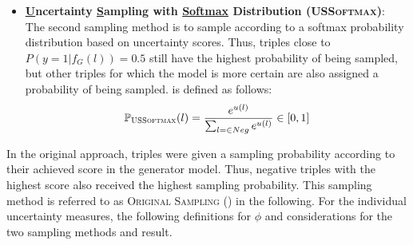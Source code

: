 \begin{itemize}
    \item
    \textbf{\underline{U}ncertainty \underline{S}ampling with \underline{Softmax} Distribution (\textsc{USSoftmax})}:\\    
    The second sampling method is to sample according to a softmax probability distribution based on uncertainty scores.
    Thus, triples close to $P(y = 1 | f_G(l)) = 0.5$ still have the highest probability of being sampled, but other triples for which the model is more certain are also assigned a probability of being sampled.
    \ussoftmax is defined as follows:
    \begin{equation}
        \label{eq:ussoftmax}
        \mathbb{P}_{\textsc{USSoftmax}}(l) = \frac{e^{u(l)}}{\sum_{l = \in Neg}{e^{u(l)}}} \in [0,1]
    \end{equation}
\end{itemize}
In the original \kbgan approach, triples were given a sampling probability according to their achieved score in the generator model.
Thus, negative triples with the highest score also received the highest sampling probability.
This sampling method is referred to as \textsc{Original Sampling} (\origsampling) in the following.
For the individual uncertainty measures, the following definitions for $\phi$ and considerations for the two sampling methods \usmax and \ussoftmax result.

